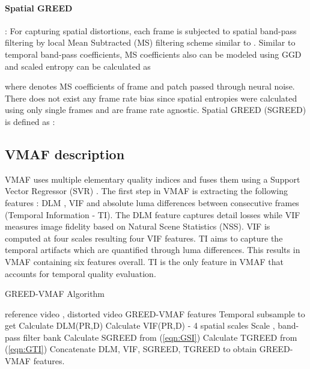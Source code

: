 \documentclass[conference]{IEEEtran}
\begin{document}
\paragraph*{\textbf{Spatial GREED}}: For capturing spatial distortions, each frame is subjected to spatial band-pass filtering by local Mean Subtracted (MS) filtering scheme similar to \cite{bampis2017speed}. Similar to temporal band-pass coefficients, MS coefficients also can be modeled using GGD and scaled entropy can be calculated as

where  denotes MS coefficients of frame  and patch  passed through neural noise. There does not exist any frame rate bias since spatial entropies were calculated using only single frames and are frame rate agnostic. Spatial GREED (SGREED) is defined as :


\subsection{VMAF description}
VMAF uses multiple elementary quality indices and fuses them using a Support Vector Regressor (SVR) \cite{VMAF2016}. The first step in VMAF is extracting the following features : DLM \cite{li2011image}, VIF \cite{sheikh2006image} and absolute luma differences between consecutive frames (Temporal Information - TI). The DLM feature captures detail losses while VIF measures image fidelity based on Natural Scene Statistics (NSS). VIF is computed at four scales resulting four VIF features. TI aims to capture the temporal artifacts which are quantified through luma differences. This results in VMAF containing six features overall. TI is the only feature in VMAF that accounts for temporal quality evaluation.

\begin{algorithm}[t] \caption{GREED-VMAF Algorithm}
\begin{algorithmic}[1]
\Require reference video , distorted video 
\Ensure GREED-VMAF features
\State Temporal subsample  to get 
\State Calculate DLM(PR,D)
\State Calculate VIF(PR,D) - 4 spatial scales
\State Scale , band-pass filter bank 
\ForEach {}
\State Calculate SGREED from (\ref{eqn:GSI})
\ForEach {}
\State Calculate TGREED from (\ref{eqn:GTI})
\EndFor
\EndFor
\State Concatenate DLM, VIF, SGREED, TGREED to obtain GREED-VMAF features.
\end{algorithmic}
\label{alg1}
\end{algorithm}
\end{document}
